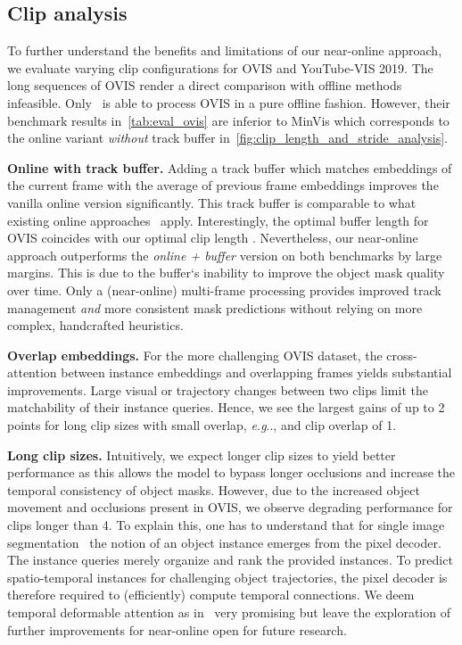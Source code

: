 \documentclass{article}
\makeatletter
\theoremstyle{plain}
\theoremstyle{definition}
\theoremstyle{remark}
\DeclareRobustCommand\onedot{\futurelet\@let@token\@onedot}
\def\@onedot{\ifx\@let@token.\else.\null\fi\xspace}
\def\eg{\emph{e.g}\onedot} \def\Eg{\emph{E.g}\onedot}
\makeatother
\begin{document}
\subsection{Clip analysis}
To further understand the benefits and limitations of our near-online approach, we evaluate varying clip configurations for OVIS and YouTube-VIS 2019.
The long sequences of OVIS render a direct comparison with offline methods infeasible.
Only~\cite{heo2022vita} is able to process OVIS in a pure offline fashion.
However, their benchmark results in~\cref{tab:eval_ovis} are inferior to MinVis which corresponds to the online variant \emph{without} track buffer in~\cref{fig:clip_length_and_stride_analysis}.

\noindent \textbf{Online with track buffer.}
Adding a track buffer which matches embeddings of the current frame with the average of previous frame embeddings improves the vanilla online version significantly.
This track buffer is comparable to what existing online approaches~\cite{IDOL,VISOLO} apply.
Interestingly, the optimal buffer length for OVIS coincides with our optimal clip length .
Nevertheless, our near-online approach outperforms the \emph{online + buffer} version on both benchmarks by large margins.
This is due to the buffer`s inability to improve the object mask quality over time.
Only a (near-online) multi-frame processing provides improved track management \emph{and} more consistent mask predictions without relying on more complex, handcrafted heuristics.

\noindent \textbf{Overlap embeddings.}
For the more challenging OVIS dataset, the cross-attention between instance embeddings and overlapping frames yields substantial improvements.
Large visual or trajectory changes between two clips limit the matchability of their instance queries.
Hence, we see the largest gains of up to 2 points for long clip sizes with small overlap, \eg,  and clip overlap of 1.

\noindent \textbf{Long clip sizes.}
Intuitively, we expect longer clip sizes  to yield better performance as this allows the model to bypass longer occlusions and increase the temporal consistency of object masks.
However, due to the increased object movement and occlusions present in OVIS, we observe degrading performance for clips longer than 4. 
To explain this, one has to understand that for single image segmentation~\cite{cheng2021mask2former} the notion of an object instance emerges from the pixel decoder.
The instance queries merely organize and rank the provided instances.
To predict spatio-temporal instances for challenging object trajectories, the pixel decoder is therefore required to (efficiently) compute temporal connections.
We deem temporal deformable attention as in~\cite{devis,zhou2022transvod} very promising but leave the exploration of further improvements for near-online open for future research.
\end{document}
